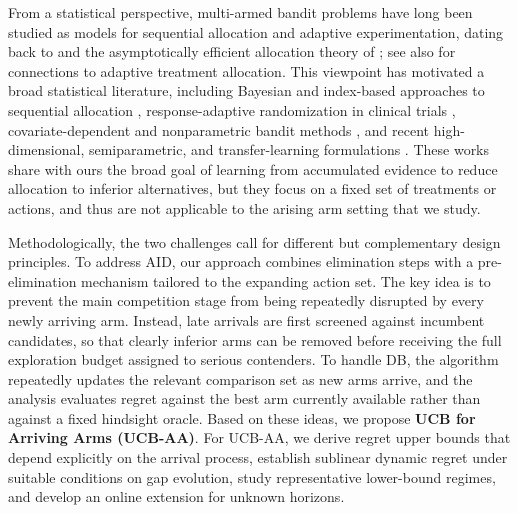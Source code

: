 \documentclass[
  12pt]{article}
\begin{document}
From a statistical perspective, multi-armed bandit problems have long been studied as models for sequential allocation and adaptive experimentation, dating back to \textcite{Robbins1952} and the asymptotically efficient allocation theory of \textcite{LAI19854}; see also \textcite{Lai1987} for connections to adaptive treatment allocation. This viewpoint has motivated a broad statistical literature, including Bayesian and index-based approaches to sequential allocation \parencite{Gittins1979,BerryFristedt1985}, response-adaptive randomization in clinical trials \parencite{Zelen1969,WeiDurham1978,VillarBowdenWason2015,WilliamsonVillar2020,AzizKaufmannRiviere2021}, covariate-dependent and nonparametric bandit methods \parencite{Woodroofe1979,YangZhu2002,RigolletZeevi2010,PerchetRigollet2013}, and recent high-dimensional, semiparametric, and transfer-learning formulations \parencite{QianYang2016,QianIngLiu2023,CaiCaiLi2024}. These works share with ours the broad goal of learning from accumulated evidence to reduce allocation to inferior alternatives, but they focus on a fixed set of treatments or actions, and thus are not applicable to the arising arm setting that we study.


Methodologically, the two challenges call for different but complementary design principles. To address AID, our approach combines elimination steps \parencite{EvenDar2006SE,Auer2010UCBRI,PerchetRigollet2013,QianYang2016} with a pre-elimination mechanism tailored to the expanding action set. The key idea is to prevent the main competition stage from being repeatedly disrupted by every newly arriving arm. Instead, late arrivals are first screened against incumbent candidates, so that clearly inferior arms can be removed before receiving the full exploration budget assigned to serious contenders. To handle DB, the algorithm repeatedly updates the relevant comparison set as new arms arrive, and the analysis evaluates regret against the best arm currently available rather than against a fixed hindsight oracle. 
Based on these ideas, we propose \textbf{UCB for Arriving Arms (UCB-AA)}. For UCB-AA, we derive regret upper bounds that depend explicitly on the arrival process, establish sublinear dynamic regret under suitable conditions on gap evolution, study representative lower-bound regimes, and develop an online extension for unknown horizons.
\end{document}
